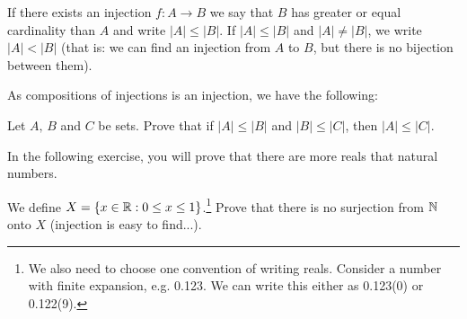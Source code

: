 \begin{definition}
  If there exists an injection $f:A\to B$ we say that $B$ has greater or equal cardinality than $A$ and write $|A|\le |B|$. If $|A|\le |B|$ and $|A|\neq |B|$, we write
  $|A| < |B|$ (that is: we can find an injection from $A$ to $B$, but there is no bijection between them).
\end{definition}

%

As compositions of injections is an injection, we have the following:

\begin{exercise}
	Let $A,\,B$ and $C$ be sets. Prove that if $|A|\le |B|$ and $|B|\le |C|$, then $|A|\le |C|$.
\end{exercise}

In the following exercise, you will prove that there are more reals that natural numbers.

\begin{exercise}
	We define $X=\{x\in \mathbb R : 0\le x\le 1\}$.\footnote{We also need to choose one
	 convention of writing reals. Consider a number with finite expansion, e.g. 0.123. We can write this either as 0.123(0) or 0.122(9).}
	Prove that there is no surjection from $\mathbb N$ onto $X$ (injection is easy to find...). 
\end{exercise}

